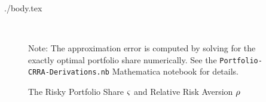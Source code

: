 \documentclass{bejournal}
\begin{document}
\begin{verbatimwrite}{./body.tex}
\begin{figure}[h]
\caption{The Risky Portfolio Share ${\varsigma}$ and Relative Risk Aversion $\rho$} \label{fig:Port}\centering
{}\\
\vspace{.1in}  \begin{flushleft} \footnotesize Note: The approximation error is computed by solving for the exactly optimal
portfolio share numerically.  See the \texttt{Portfolio-CRRA-Derivations.nb} Mathematica notebook for details.
\end{flushleft}
\end{figure}

\end{verbatimwrite}




\end{document}
